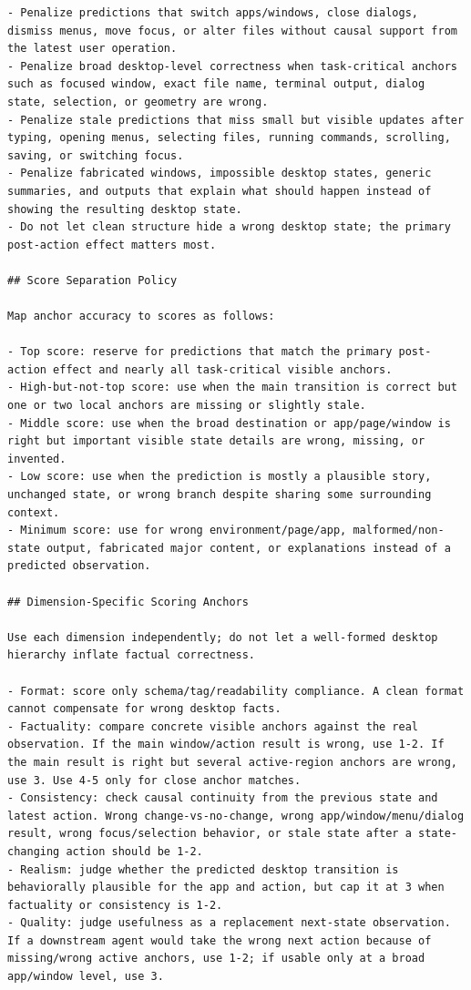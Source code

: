 \documentclass{llmxive}
\begin{document}
\begin{lstlisting}
- Penalize predictions that switch apps/windows, close dialogs, dismiss menus, move focus, or alter files without causal support from the latest user operation.
- Penalize broad desktop-level correctness when task-critical anchors such as focused window, exact file name, terminal output, dialog state, selection, or geometry are wrong.
- Penalize stale predictions that miss small but visible updates after typing, opening menus, selecting files, running commands, scrolling, saving, or switching focus.
- Penalize fabricated windows, impossible desktop states, generic summaries, and outputs that explain what should happen instead of showing the resulting desktop state.
- Do not let clean structure hide a wrong desktop state; the primary post-action effect matters most.

## Score Separation Policy

Map anchor accuracy to scores as follows:

- Top score: reserve for predictions that match the primary post-action effect and nearly all task-critical visible anchors.
- High-but-not-top score: use when the main transition is correct but one or two local anchors are missing or slightly stale.
- Middle score: use when the broad destination or app/page/window is right but important visible state details are wrong, missing, or invented.
- Low score: use when the prediction is mostly a plausible story, unchanged state, or wrong branch despite sharing some surrounding context.
- Minimum score: use for wrong environment/page/app, malformed/non-state output, fabricated major content, or explanations instead of a predicted observation.

## Dimension-Specific Scoring Anchors

Use each dimension independently; do not let a well-formed desktop hierarchy inflate factual correctness.

- Format: score only schema/tag/readability compliance. A clean format cannot compensate for wrong desktop facts.
- Factuality: compare concrete visible anchors against the real observation. If the main window/action result is wrong, use 1-2. If the main result is right but several active-region anchors are wrong, use 3. Use 4-5 only for close anchor matches.
- Consistency: check causal continuity from the previous state and latest action. Wrong change-vs-no-change, wrong app/window/menu/dialog result, wrong focus/selection behavior, or stale state after a state-changing action should be 1-2.
- Realism: judge whether the predicted desktop transition is behaviorally plausible for the app and action, but cap it at 3 when factuality or consistency is 1-2.
- Quality: judge usefulness as a replacement next-state observation. If a downstream agent would take the wrong next action because of missing/wrong active anchors, use 1-2; if usable only at a broad app/window level, use 3.


\end{lstlisting}
\end{document}
